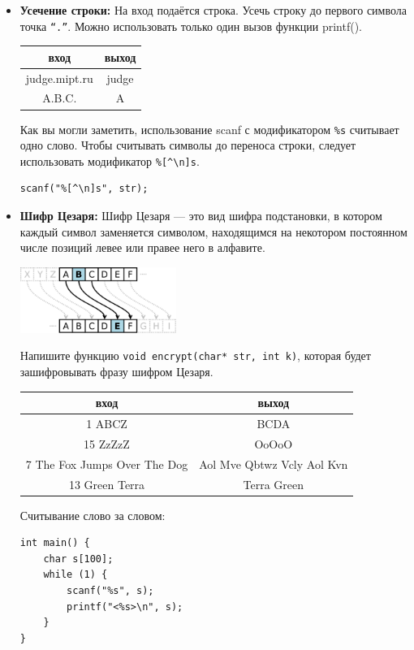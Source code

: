\documentclass{article}
\begin{document}
\begin{itemize}
\item \textbf{Усечение строки:} На вход подаётся строка. Усечь строку до первого символа точка \texttt{``.''}. Можно использовать только один вызов функции printf().
\begin{center}
\begin{tabular}{ c | c }
 вход & выход \\ \hline
 judge.mipt.ru & judge \\
 A.B.C. & A  \\ 
\end{tabular}
\end{center}

Как вы могли заметить, использование scanf с модификатором \texttt{\%s} считывает одно слово. Чтобы считывать символы до переноса строки, следует использовать модификатор \verb|%[^\n]s|.
\begin{lstlisting}
scanf("%[^\n]s", str);
\end{lstlisting}

\item \textbf{Шифр Цезаря:} Шифр Цезаря — это вид шифра подстановки, в котором каждый символ заменяется символом, находящимся на некотором постоянном числе позиций левее или правее него в алфавите. 
\begin{center}
\includegraphics[width=0.4\textwidth]{caesar.png}
\end{center}
Напишите функцию \texttt{void encrypt(char* str, int k)}, которая будет зашифровывать фразу шифром Цезаря.
\begin{center}
\begin{tabular}{ c | c }
 вход & выход \\ \hline
 1 ABCZ & BCDA\\
 15 ZzZzZ & OoOoO \\
 7 The Fox Jumps Over The Dog & Aol Mve Qbtwz Vcly Aol Kvn \\
 13  Green Terra & Terra Green
\end{tabular}
\end{center}

Считывание слово за словом:
\begin{lstlisting}
int main() {
    char s[100];
    while (1) {
        scanf("%s", s);
        printf("<%s>\n", s);
    }
}
\end{lstlisting}


\end{itemize}
\end{document}
